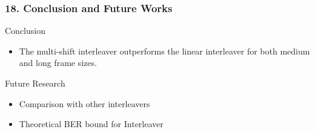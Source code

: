 \documentclass{beamer}  %
\begin{document}
\begin{frame}
\frametitle{18. Conclusion and Future Works}
\begin{block}{Conclusion}
\begin{itemize}
\setlength\itemsep{2em}
\item The multi-shift
interleaver outperforms the linear interleaver for both medium and long frame sizes. 
\end{itemize}
\end{block}

\begin{block}{Future Research }



\begin{itemize}


\item Comparison with other interleavers

\item Theoretical BER bound for Interleaver







\end{itemize}
\end{block}
\end{frame}
\end{document}
